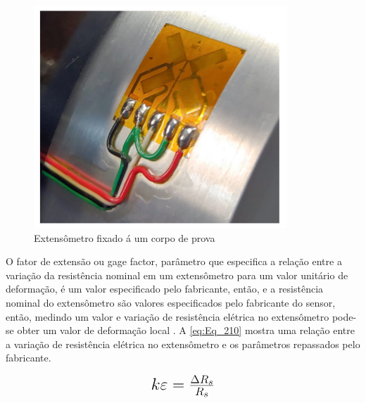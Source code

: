 \begin{figure}[htb]
	\caption{\label{fig:1080} Extensômetro fixado á um corpo de prova}
	\begin{center}
		\includegraphics[width=\textwidth]{pictures/1080.png}
	\end{center}
\end{figure}

O fator de extensão ou gage factor, parâmetro que especifica a relação entre a variação da resistência nominal em um extensômetro para um valor unitário
de deformação, é um valor especificado pelo fabricante, então, e a resistência nominal do extensômetro são valores especificados pelo fabricante do sensor,
então, medindo um valor e variação de resistência elétrica no extensômetro pode-se obter um valor de deformação local \autocite{Hollman2011}.
A \autoref{eq:Eq_210} mostra uma relação entre a variação de resistência elétrica no extensômetro e os parâmetros repassados pelo fabricante.

\begin{equation}\label{eq:Eq_210}%
\mbox{\fontsize{17.28}{21.6}\selectfont\( %
k \varepsilon = \frac{\Delta R_s }{R_s}
\)} %
\end{equation}

%
%
%
%
%

